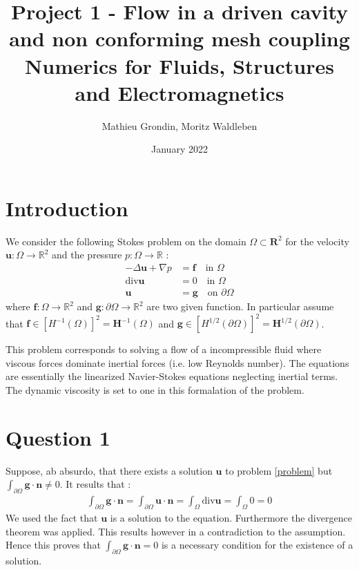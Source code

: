 \documentclass{article}
\title{%
  Project 1 - Flow in a driven cavity and non conforming mesh coupling \\
  \bigskip
  \large Numerics for Fluids, Structures and Electromagnetics}
\author{Mathieu Grondin, Moritz Waldleben}
\date{January 2022}
\begin{document}
\maketitle

\section*{Introduction}
We consider the following Stokes problem on the domain $\Omega \subset
\mathbf{R}^2$ for the velocity $\mathbf{u} : \Omega \rightarrow \mathbb{R}^2$
and the pressure $p:\Omega \rightarrow \mathbb{R}$ :
\begin{align}
    \label{problem}
    -\Delta \mathbf{u} + \nabla p &= \mathbf{f}  \quad\textrm{in } \Omega\nonumber\\ 
    \textrm{div} \mathbf{u} &= 0 \quad \textrm{in } \Omega \\
    \mathbf{u} &= \mathbf{g} \quad \textrm{on } \partial \Omega  \nonumber
\end{align}
where $\mathbf{f} : \Omega \rightarrow \mathbb{R}^2$ and $\mathbf{g} :
\partial\Omega\rightarrow\mathbb{R}^2$ are two given function. In particular
assume that $\mathbf{f} \in [H^{-1}(\Omega)]^2=\mathbf{H}^{-1}(\Omega)$ and
$\mathbf{g} \in [H^{1/2}(\partial\Omega)]^2=\mathbf{H}^{1/2}(\partial\Omega)$.

This problem corresponds to solving a flow of a incompressible fluid where
viscous forces dominate inertial forces (i.e. low Reynolds number). The
equations are essentially the linearized Navier-Stokes equations neglecting
inertial terms. The dynamic viscosity is set to one in this formalation of the
problem. 

\section{Question 1}
Suppose, ab absurdo, that there exists a solution $\mathbf{u}$ to problem \ref{problem} but \\
$\int_{\partial\Omega}\mathbf{g}\cdot\mathbf{n} \neq 0$. It results that : 
\begin{align*}
    \int_{\partial\Omega}\mathbf{g}\cdot\mathbf{n} = \int_{\partial\Omega}\mathbf{u}\cdot \mathbf{n} = \int_{\Omega}\textrm{div}\mathbf{u}=\int_{\Omega}0=0 
\end{align*}
We used the fact that $\mathbf{u}$ is a solution to the equation. Furthermore
the divergence theorem was applied. This results however in a contradiction to
the assumption. Hence this proves that  $\int_{\partial\Omega}
\mathbf{g}\cdot\mathbf{n}=0$ is a necessary condition for the existence of a
solution.
\end{document}
